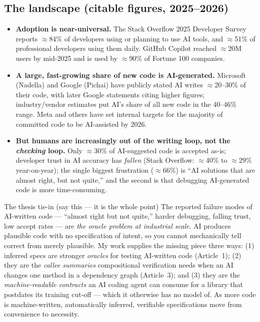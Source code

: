 \documentclass[11pt]{article}
\begin{document}
\subsection{The landscape (citable figures, 2025--2026)}
\begin{itemize}[leftmargin=1.4em,itemsep=0.1em]
  \item \textbf{Adoption is near-universal.} The Stack Overflow 2025 Developer
        Survey reports $\approx$84\% of developers using or planning to use AI
        tools, and $\approx$51\% of professional developers using them daily.
        GitHub Copilot reached $\approx$20M users by mid-2025 and is used by
        $\approx$90\% of Fortune 100 companies.
  \item \textbf{A large, fast-growing share of new code is AI-generated.}
        Microsoft (Nadella) and Google (Pichai) have publicly stated AI writes
        $\approx$20--30\% of their code, with later Google statements citing
        higher figures; industry/vendor estimates put AI's share of all new
        code in the 40--46\% range. Meta and others have set internal targets
        for the majority of committed code to be AI-assisted by 2026.
  \item \textbf{But humans are increasingly out of the writing loop, not the
        \emph{checking} loop.} Only $\approx$30\% of AI-suggested code is
        accepted as-is; developer trust in AI accuracy has \emph{fallen}
        (Stack Overflow: $\approx$40\% to $\approx$29\% year-on-year); the
        single biggest frustration ($\approx$66\%) is ``AI solutions that are
        almost right, but not quite,'' and the second is that debugging
        AI-generated code is more time-consuming.
\end{itemize}

\begin{okboxx}{The thesis tie-in (say this --- it is the whole point)}
The reported failure modes of AI-written code --- ``almost right but not quite,''
harder debugging, falling trust, low accept rates --- are \emph{the oracle
problem at industrial scale}. AI produces plausible code with no specification
of intent, so you cannot mechanically tell correct from merely plausible. My
work supplies the missing piece three ways: (1) inferred specs are stronger
\emph{oracles} for testing AI-written code (Article~1); (2) they are the
\emph{callee summaries} compositional verification needs when an AI changes one
method in a dependency graph (Article~3); and (3) they are the
\emph{machine-readable contracts} an AI coding agent can consume for a library
that postdates its training cut-off --- which it otherwise has no model of. As
more code is machine-written, automatically inferred, verifiable specifications
move from convenience to necessity.
\end{okboxx}
\end{document}
